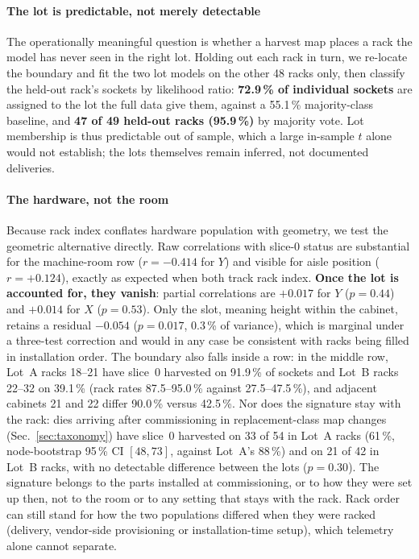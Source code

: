 \documentclass[10pt,conference]{IEEEtran}
\begin{document}
\paragraph*{The lot is predictable, not merely detectable} The operationally meaningful question
is whether a harvest map places a rack the model has never seen in the right lot. Holding out each
rack in turn, we re-locate the boundary and fit the two lot models on the other 48 racks only, then
classify the held-out rack's sockets by likelihood ratio: \textbf{72.9\,\% of individual sockets}
are assigned to the lot the full data give them, against a 55.1\,\% majority-class baseline, and
\textbf{47 of 49 held-out racks (95.9\,\%)} by majority vote. Lot membership is thus predictable
out of sample, which a large in-sample $t$ alone would not establish; the lots themselves remain
inferred, not documented deliveries.

\paragraph*{The hardware, not the room} \label{par:geom} Because rack index conflates hardware
population with geometry, we test the geometric alternative directly. Raw correlations with slice-0 status are
substantial for the machine-room row ($r=-0.414$ for $Y$) and visible for aisle position
($r=+0.124$), exactly as expected when both track rack index. \textbf{Once the lot is accounted
for, they vanish}: partial correlations are $+0.017$ for $Y$ ($p=0.44$) and $+0.014$ for $X$
($p=0.53$). Only the slot, meaning height within the cabinet, retains a residual $-0.054$ ($p=0.017$,
0.3\,\% of variance), which is marginal under a three-test correction and would in any case be
consistent with racks being filled in installation order. The boundary also falls inside a row:
in the middle row, Lot~A racks 18--21 have slice~0 harvested on 91.9\,\% of sockets and Lot~B racks
22--32 on 39.1\,\% (rack rates 87.5--95.0\,\% against 27.5--47.5\,\%), and adjacent cabinets 21
and 22 differ 90.0\,\% versus 42.5\,\%. Nor does the signature stay with the rack: dies arriving
after commissioning in replacement-class map changes (Sec.~\ref{sec:taxonomy}) have slice~0
harvested on 33 of 54 in Lot~A racks (61\,\%, node-bootstrap 95\,\% CI $[48,73]$, against Lot~A's
88\,\%) and on 21 of 42 in Lot~B racks, with no detectable difference between the lots ($p=0.30$).
The signature belongs to the parts installed at commissioning, or to how they were set up then,
not to the room or to any setting that stays with the rack. Rack order can still stand for how the
two populations differed when they were racked (delivery, vendor-side provisioning or
installation-time setup), which telemetry alone cannot separate.
\end{document}
